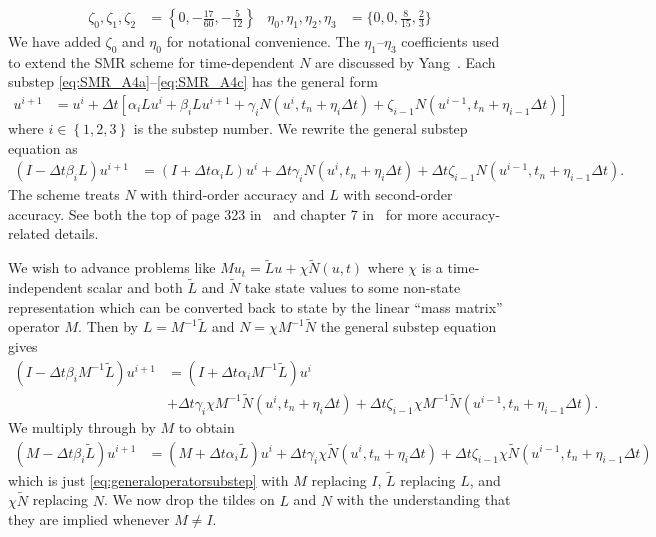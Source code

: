 \documentclass[letterpaper,11pt,nointlimits,reqno]{amsart}
\begin{document}
\begin{align*}
  \zeta_0, \zeta_1, \zeta_2 &= \left\{
    0, -\frac{17}{60}, -\frac{5}{12}
  \right\}
  &
  \eta_0, \eta_1, \eta_2, \eta_3 &= \Biggl\{
    0, 0, \frac{8}{15}, \frac{2}{3}
  \Biggr\}
\end{align*}
We have added $\zeta_0$ and $\eta_0$ for notational convenience.  The
$\eta_{1}$--$\eta_{3}$ coefficients used to extend the SMR scheme for
time-dependent $N$ are discussed by Yang~\cite{ShanYang2011}.  Each substep
\eqref{eq:SMR_A4a}--\eqref{eq:SMR_A4c} has the general form
\begin{align}
  u^{i+1} &= u^i + \Delta{}t \left[
        \alpha_{i} L u^i
      + \beta_{i}  L u^{i+1}
      + \gamma_{i} N\left( u^{i}, t_{n}+\eta_{i}\Delta{}t \right)
      + \zeta_{i-1} N\left( u^{i-1}, t_{n}+\eta_{i-1}\Delta{}t \right)
  \right]
  \label{eq:generalsubstep}
\end{align}
where $i\in\left\{ 1,2,3 \right\}$ is the substep number.
We rewrite the general substep equation as
\begin{align}
  \left(I - \Delta{}t\beta_{i}L\right) u^{i+1}
  &=
  \left(I + \Delta{}t\alpha_{i}L\right) u^{i}
  + \Delta{}t\gamma_{i}N\left(u^{i}, t_{n}+\eta_{i}\Delta{}t\right)
  + \Delta{}t\zeta_{i-1}N\left(u^{i-1}, t_{n}+\eta_{i-1}\Delta{}t\right)
  \label{eq:generaloperatorsubstep}
  .
\end{align}
The scheme treats $N$ with third-order accuracy and $L$ with second-order
accuracy.  See both the top of page 323 in~\cite{spalart_lowstoragerk} and
chapter 7 in~\cite{ShanYang2011} for more accuracy-related details.

We wish to advance problems like $Mu_{t}=\tilde{L}u+\chi\tilde{N}\left( u,t
\right)$ where $\chi$ is a time-independent scalar and both $\tilde{L}$ and
$\tilde{N}$ take state values to some non-state representation which can be
converted back to state by the linear ``mass matrix'' operator $M$.  Then by
$L=M^{-1}\tilde{L}$ and $N=\chi{}M^{-1}\tilde{N}$ the general substep equation
gives
\begin{align}
  \left(I - \Delta{}t\beta_{i}M^{-1}\tilde{L}\right) u^{i+1}
  &=
  \left(I + \Delta{}t\alpha_{i}M^{-1}\tilde{L}\right) u^{i}
\\
  &+ \Delta{}t\gamma_{i}\chi{}M^{-1}
    \tilde{N}\left(u^{i}, t_{n}+\eta_{i}\Delta{}t\right)
  + \Delta{}t\zeta_{i-1}\chi{}M^{-1}
    \tilde{N}\left(u^{i-1}, t_{n}+\eta_{i-1}\Delta{}t\right)
  .
\end{align}
We multiply through by $M$ to obtain
\begin{align}
  \left(M - \Delta{}t\beta_{i}\tilde{L}\right) u^{i+1}
  &=
  \left(M + \Delta{}t\alpha_{i}\tilde{L}\right) u^{i}
  + \Delta{}t\gamma_{i}\chi{}
    \tilde{N}\left(u^{i}, t_{n}+\eta_{i}\Delta{}t\right)
  + \Delta{}t\zeta_{i-1}\chi{}
    \tilde{N}\left(u^{i-1}, t_{n}+\eta_{i-1}\Delta{}t\right)
  \label{eq:generaloperatormasssubstep}
\end{align}
which is just \eqref{eq:generaloperatorsubstep} with $M$ replacing $I$,
$\tilde{L}$ replacing $L$, and $\chi{}\tilde{N}$ replacing $N$.  We now drop
the tildes on $L$ and $N$ with the understanding that they are implied whenever
$M\neq{}I$.
\end{document}
